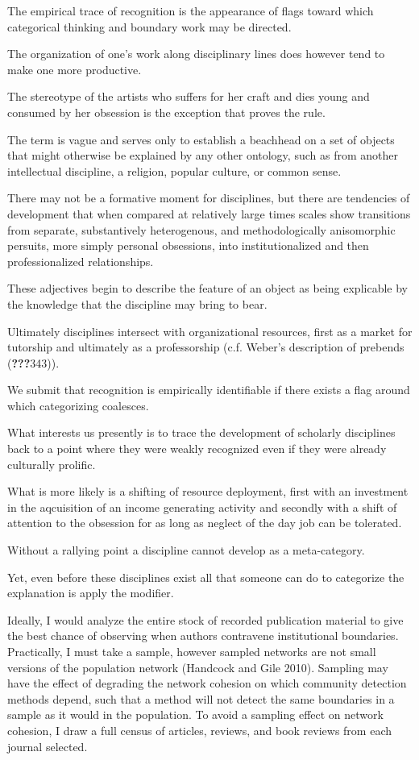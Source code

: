 The empirical trace of recognition is the appearance of flags toward
which categorical thinking and boundary work may be directed.

The organization of one's work along disciplinary lines does however
tend to make one more productive.

The stereotype of the artists who suffers for her craft and dies young
and consumed by her obsession is the exception that proves the rule.

The term is vague and serves only to establish a beachhead on a set of
objects that might otherwise be explained by any other ontology, such as
from another intellectual discipline, a religion, popular culture, or
common sense.

There may not be a formative moment for disciplines, but there are
tendencies of development that when compared at relatively large times
scales show transitions from separate, substantively heterogenous, and
methodologically anisomorphic persuits, more simply personal obsessions,
into institutionalized and then professionalized relationships.

These adjectives begin to describe the feature of an object as being
explicable by the knowledge that the discipline may bring to bear.

Ultimately disciplines intersect with organizational resources, first as
a market for tutorship and ultimately as a professorship (c.f. Weber's
description of prebends ({\textbf{???}}343)).

We submit that recognition is empirically identifiable if there exists a
flag around which categorizing coalesces.

What interests us presently is to trace the development of scholarly
disciplines back to a point where they were weakly recognized even if
they were already culturally prolific.

What is more likely is a shifting of resource deployment, first with an
investment in the aqcuisition of an income generating activity and
secondly with a shift of attention to the obsession for as long as
neglect of the day job can be tolerated.

Without a rallying point a discipline cannot develop as a meta-category.

Yet, even before these disciplines exist all that someone can do to
categorize the explanation is apply the modifier.

Ideally, I would analyze the entire stock of recorded publication
material to give the best chance of observing when authors contravene
institutional boundaries. Practically, I must take a sample, however
sampled networks are not small versions of the population network
(Handcock and Gile 2010). Sampling may have the effect of degrading the
network cohesion on which community detection methods depend, such that
a method will not detect the same boundaries in a sample as it would in
the population. To avoid a sampling effect on network cohesion, I draw a
full census of articles, reviews, and book reviews from each journal
selected.

